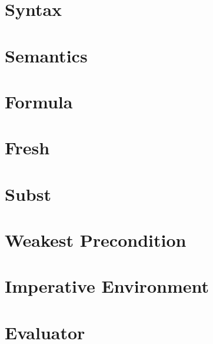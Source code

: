 \section{Syntax}


\section{Semantics}


\section{Formula}


\section{Fresh}


\section{Subst}


\section{Weakest Precondition}


\section{Imperative Environment}


\section{Evaluator}






